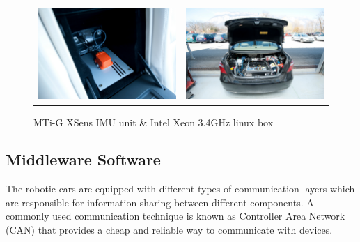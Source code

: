 \begin{figure}[h]
   \centering
     \begin{tabular}{lr}
       \includegraphics[width=0.45\columnwidth]{img/testbed:xsens}
       & \includegraphics[width=0.45\columnwidth]{img/testbed:trunc}
     \end{tabular}
   \caption{MTi-G XSens IMU unit \& Intel Xeon 3.4GHz linux box}
   \label{fig:Lexus2}
 \end{figure}





\subsection{Middleware Software}

The robotic cars are equipped with different types of communication layers which are responsible for information sharing between different components. A commonly used communication technique is known as Controller Area Network (CAN) that provides a cheap and reliable way to communicate with devices.%

